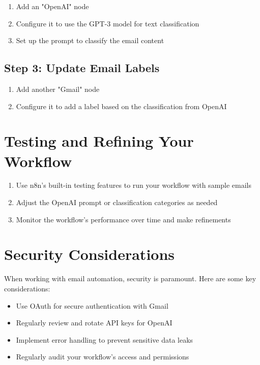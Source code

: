 \begin{enumerate}
    \item Add an "OpenAI" node
    \item Configure it to use the GPT-3 model for text classification
    \item Set up the prompt to classify the email content
\end{enumerate}


\subsection{Step 3: Update Email Labels}

\begin{enumerate}
    \item Add another "Gmail" node
    \item Configure it to add a label based on the classification from OpenAI
\end{enumerate}


\section{Testing and Refining Your Workflow}

\begin{enumerate}
    \item Use n8n's built-in testing features to run your workflow with sample emails
    \item Adjust the OpenAI prompt or classification categories as needed
    \item Monitor the workflow's performance over time and make refinements
\end{enumerate}

\section{Security Considerations}

When working with email automation, security is paramount. Here are some key considerations:

\begin{itemize}
    \item Use OAuth for secure authentication with Gmail
    \item Regularly review and rotate API keys for OpenAI
    \item Implement error handling to prevent sensitive data leaks
    \item Regularly audit your workflow's access and permissions
\end{itemize}

